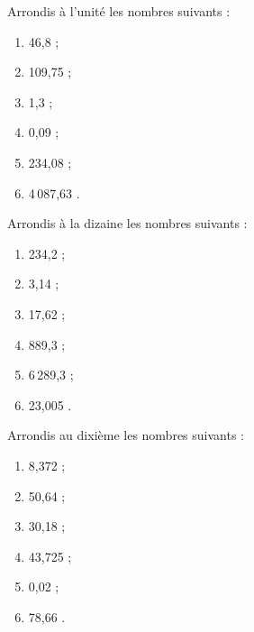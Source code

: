 

\begin{exercice}
Arrondis à l'unité les nombres suivants :
\begin{enumerate}
 \item 46,8 \dotfill ; 
 
 \item 109,75 \dotfill ; 
 
 \item 1,3 \dotfill ; 
 
 \item 0,09 \dotfill ; 
 
 \item 234,08 \dotfill ; 
 
 \item 4\,087,63 \dotfill. 
 
 \end{enumerate}
\end{exercice}


\begin{exercice}
Arrondis à la dizaine les nombres suivants :
\begin{enumerate}
 \item 234,2 \dotfill ; 
 
 \item 3,14 \dotfill ; 
 
 \item 17,62 \dotfill ; 
 
 \item 889,3 \dotfill ; 
 
 \item 6\,289,3 \dotfill ; 
 
 \item 23,005 \dotfill. 
 
 \end{enumerate}
\end{exercice}


\begin{exercice}
Arrondis au dixième les nombres suivants :
\begin{enumerate}
 \item 8,372 \dotfill ; 
 
 \item 50,64 \dotfill ; 
 
 \item 30,18 \dotfill ; 
 
 \item 43,725 \dotfill ; 
 
 \item 0,02 \dotfill ; 
 
 \item 78,66 \dotfill. 
 
 \end{enumerate}
\end{exercice}


